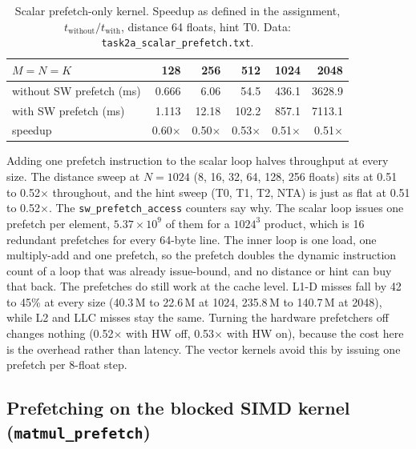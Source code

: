 \documentclass[11pt,a4paper]{article}
\begin{document}
\begin{table}[H]
\centering\small
\caption{Scalar prefetch-only kernel. Speedup as defined in the assignment, $t_{\text{without}}/t_{\text{with}}$, distance 64 floats, hint T0. Data: \texttt{task2a\_scalar\_prefetch.txt}.}
\begin{tabular}{lrrrrr}
\toprule
$M=N=K$ & 128 & 256 & 512 & 1024 & 2048 \\
\midrule
without SW prefetch (ms) & 0.666 & 6.06 & 54.5 & 436.1 & 3628.9 \\
with SW prefetch (ms)    & 1.113 & 12.18 & 102.2 & 857.1 & 7113.1 \\
speedup                  & 0.60$\times$ & 0.50$\times$ & 0.53$\times$ & 0.51$\times$ & 0.51$\times$ \\
\bottomrule
\end{tabular}
\end{table}

Adding one prefetch instruction to the scalar loop halves throughput at every size. The distance sweep at $N=1024$ (8, 16, 32, 64, 128, 256 floats) sits at 0.51 to 0.52$\times$ throughout, and the hint sweep (T0, T1, T2, NTA) is just as flat at 0.51 to 0.52$\times$. The \texttt{sw\_prefetch\_access} counters say why. The scalar loop issues one prefetch per element, $5.37\times10^9$ of them for a $1024^3$ product, which is 16 redundant prefetches for every 64-byte line. The inner loop is one load, one multiply-add and one prefetch, so the prefetch doubles the dynamic instruction count of a loop that was already issue-bound, and no distance or hint can buy that back. The prefetches do still work at the cache level. L1-D misses fall by 42 to 45\% at every size (40.3\,M to 22.6\,M at 1024, 235.8\,M to 140.7\,M at 2048), while L2 and LLC misses stay the same. Turning the hardware prefetchers off changes nothing (0.52$\times$ with HW off, 0.53$\times$ with HW on), because the cost here is the overhead rather than latency. The vector kernels avoid this by issuing one prefetch per 8-float step.

\subsection{Prefetching on the blocked SIMD kernel (\texttt{matmul\_prefetch})}
\end{document}
